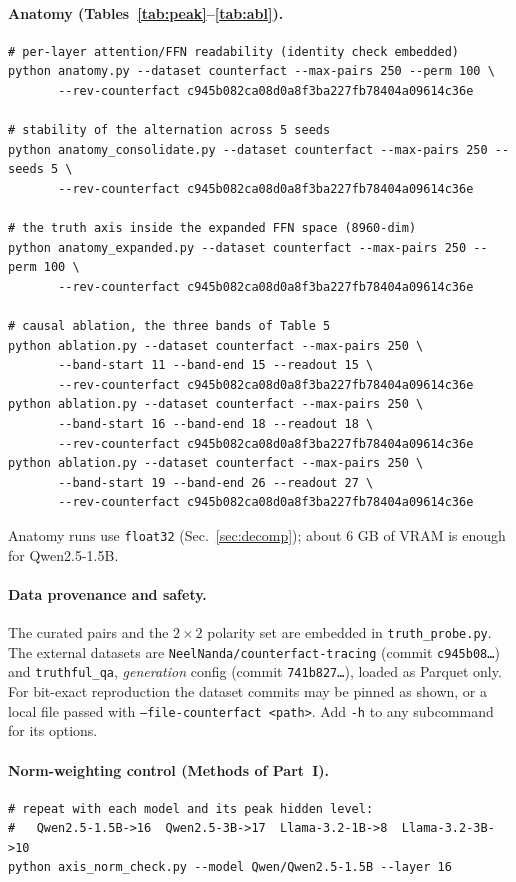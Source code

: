 \documentclass[11pt]{article}
\begin{document}
\paragraph{Anatomy (Tables~\ref{tab:peak}--\ref{tab:abl}).}
\begin{verbatim}
# per-layer attention/FFN readability (identity check embedded)
python anatomy.py --dataset counterfact --max-pairs 250 --perm 100 \
       --rev-counterfact c945b082ca08d0a8f3ba227fb78404a09614c36e

# stability of the alternation across 5 seeds
python anatomy_consolidate.py --dataset counterfact --max-pairs 250 --seeds 5 \
       --rev-counterfact c945b082ca08d0a8f3ba227fb78404a09614c36e

# the truth axis inside the expanded FFN space (8960-dim)
python anatomy_expanded.py --dataset counterfact --max-pairs 250 --perm 100 \
       --rev-counterfact c945b082ca08d0a8f3ba227fb78404a09614c36e

# causal ablation, the three bands of Table 5
python ablation.py --dataset counterfact --max-pairs 250 \
       --band-start 11 --band-end 15 --readout 15 \
       --rev-counterfact c945b082ca08d0a8f3ba227fb78404a09614c36e
python ablation.py --dataset counterfact --max-pairs 250 \
       --band-start 16 --band-end 18 --readout 18 \
       --rev-counterfact c945b082ca08d0a8f3ba227fb78404a09614c36e
python ablation.py --dataset counterfact --max-pairs 250 \
       --band-start 19 --band-end 26 --readout 27 \
       --rev-counterfact c945b082ca08d0a8f3ba227fb78404a09614c36e
\end{verbatim}
Anatomy runs use \texttt{float32} (Sec.~\ref{sec:decomp}); about $6$ GB of
VRAM is enough for Qwen2.5-1.5B.

\paragraph{Data provenance and safety.} The curated pairs and the
$2{\times}2$ polarity set are embedded in \texttt{truth\_probe.py}. The
external datasets are \texttt{NeelNanda/counterfact-tracing} (commit
\texttt{c945b08\ldots}) and \texttt{truthful\_qa}, \emph{generation} config
(commit \texttt{741b827\ldots}), loaded as Parquet only. For bit-exact
reproduction the dataset commits may be pinned as shown, or a local file
passed with \texttt{--file-counterfact <path>}. Add \texttt{-h} to any
subcommand for its options.



\paragraph{Norm-weighting control (Methods of Part~I).}
\begin{verbatim}
# repeat with each model and its peak hidden level:
#   Qwen2.5-1.5B->16  Qwen2.5-3B->17  Llama-3.2-1B->8  Llama-3.2-3B->10
python axis_norm_check.py --model Qwen/Qwen2.5-1.5B --layer 16
\end{verbatim}
\end{document}
